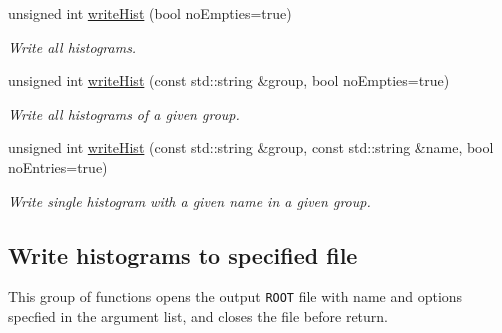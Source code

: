 \begin{CompactItemize}
\item 
\hypertarget{namespaceServices_1_1Histogramming_4e8dabf41bf6806eed9a8641a1241815}{
unsigned int \hyperlink{namespaceServices_1_1Histogramming_4e8dabf41bf6806eed9a8641a1241815}{write\-Hist} (bool no\-Empties=true)}
\label{namespaceServices_1_1Histogramming_4e8dabf41bf6806eed9a8641a1241815}

\begin{CompactList}\small\item\em Write all histograms. \item\end{CompactList}\item 
\hypertarget{namespaceServices_1_1Histogramming_c5d6b92f2c49e4ab66d25b3c44771b34}{
unsigned int \hyperlink{namespaceServices_1_1Histogramming_c5d6b92f2c49e4ab66d25b3c44771b34}{write\-Hist} (const std::string \&group, bool no\-Empties=true)}
\label{namespaceServices_1_1Histogramming_c5d6b92f2c49e4ab66d25b3c44771b34}

\begin{CompactList}\small\item\em Write all histograms of a given group. \item\end{CompactList}\item 
\hypertarget{namespaceServices_1_1Histogramming_935176823486a59ec6356ef754564388}{
unsigned int \hyperlink{namespaceServices_1_1Histogramming_935176823486a59ec6356ef754564388}{write\-Hist} (const std::string \&group, const std::string \&name, bool no\-Entries=true)}
\label{namespaceServices_1_1Histogramming_935176823486a59ec6356ef754564388}

\begin{CompactList}\small\item\em Write single histogram with a given name in a given group. \item\end{CompactList}\end{CompactItemize}
\subsection*{Write histograms to specified file}
This group of functions opens the output {\tt ROOT} file with name and options specfied in the argument list, and closes the file before return.

